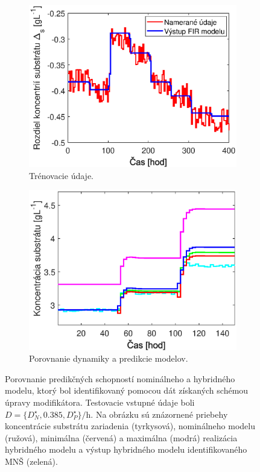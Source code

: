 \begin{figure}
	\centering
	\begin{subfigure}[b]{0.49\textwidth}
		\centering
		\includegraphics[width=\linewidth]{images/hybrid_dynamics_data}
		\caption{Trénovacie údaje. \newline}
		\label{fig:hybrid_dynamics_data}
	\end{subfigure}
	\hfill
	\begin{subfigure}[b]{0.49\textwidth}
		\centering
		\includegraphics[width=\linewidth]{images/hybrid_dynamics_comparison}
		\caption{Porovnanie dynamiky a predikcie modelov.}
		\label{fig:hybrid_dynamics_comparison}
	\end{subfigure}
	\caption{Porovnanie predikčných schopností nominálneho a hybridného modelu, ktorý bol identifikovaný pomocou dát získaných schémou úpravy modifikátora. Testovacie vstupné údaje boli $ D = \lbrace D_{N}^{\star}, 0.385, D_{P}^{\star} \rbrace \si{\per\hour} $. Na obrázku sú znázornené priebehy koncentrácie substrátu zariadenia (tyrkysová), nominálneho modelu (ružová), minimálna (červená) a maximálna (modrá) realizácia hybridného modelu a výstup hybridného modelu identifikovaného MNŠ (zelená).}
	\label{fig:hybrid_dynamics_and_prediction}
\end{figure}

